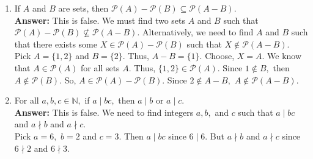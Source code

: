 \documentclass[12pt]{article}
\newcommand{\N}{\mathbb{N}}
\begin{document}
\begin{enumerate}
\begin{enumerate}
	\vfill
	\item If $A$ and $B$ are sets, then $\mathcal{P}(A) - \mathcal{P}(B)  \subseteq \mathcal{P}(A-B).$\\
	\textbf{Answer:} This is false. We must find two sets $A$ and $B$ such that $\mathcal{P}(A) - \mathcal{P}(B)  \not\subseteq \mathcal{P}(A-B).$ Alternatively, we need to find $A$ and $B$ such that there exists some $X \in \mathcal{P}(A) - \mathcal{P}(B)$ such that $X \not \in \mathcal{P}(A-B).$\\
	Pick $A=\{1,2\}$ and $B=\{2\}.$ Thus, $A-B=\{1\}.$ Choose, $X=A.$ We know that $A \in \mathcal{P}(A)$ for all sets $A.$ Thus, $\{1,2\} \in \mathcal{P}(A).$ Since $1 \not \in B,$ then $A \not \in \mathcal{P}(B).$ So, $A \in \mathcal{P}(A) - \mathcal{P}(B).$ Since $2 \not \in A-B,$ $A \not \in \mathcal{P}(A-B).$\\


	\vfill
	\item For all $a,b,c \in \N,$ if $a \mid bc,$ then $a \mid b$ or $a \mid c.$\\
	\textbf{Answer:} This is false. We need to find integers $a,b,$ and $c$ such that $a \mid bc$ and $a \nmid b$ and $a \nmid c.$\\
	Pick $a=6,$ $b=2$ and $c=3.$ Then $a \mid bc$ since $6 \mid 6.$ But $a \nmid b$ and $a \nmid c$ since $6 \nmid 2$ and $6 \nmid 3.$\\

	\vfill
	\end{enumerate}
\end{enumerate}
\end{document}
